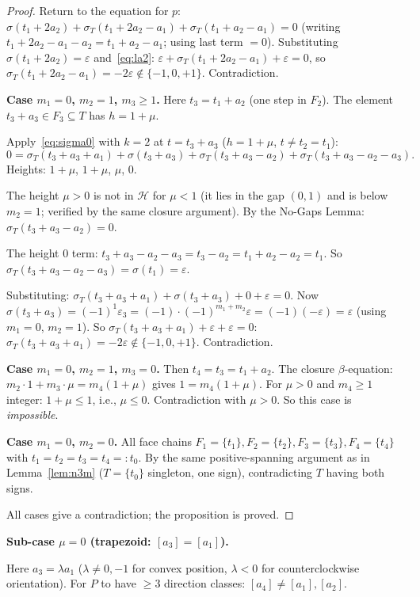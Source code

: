 \documentclass{article}
\begin{document}
\begin{proof}
Return to the equation for $p$:
$\sigma(t_1+2a_2)+\sigma_T(t_1+2a_2-a_1)+\sigma_T(t_1+a_2-a_1)=0$
(writing $t_1+2a_2-a_1-a_2=t_1+a_2-a_1$; using last term $=0$).
Substituting $\sigma(t_1+2a_2)=\varepsilon$ and~\eqref{eq:la2}:
$\varepsilon+\sigma_T(t_1+2a_2-a_1)+\varepsilon=0$,
so $\sigma_T(t_1+2a_2-a_1)=-2\varepsilon\notin\{-1,0,+1\}$.
Contradiction.

\textbf{Case $m_1=0$, $m_2=1$, $m_3\ge 1$.}
Here $t_3=t_1+a_2$ (one step in $F_2$).
The element $t_3+a_3\in F_3\subseteq T$ has $h=1+\mu$.

Apply~\eqref{eq:sigma0} with $k=2$ at $t=t_3+a_3$ ($h=1+\mu$, $t\ne t_2=t_1$):
\[
  0=\sigma_T(t_3+a_3+a_1)+\sigma(t_3+a_3)+\sigma_T(t_3+a_3-a_2)+\sigma_T(t_3+a_3-a_2-a_3).
\]
Heights: $1+\mu$, $1+\mu$, $\mu$, $0$.

The height $\mu>0$ is not in $\mathcal{H}$ for $\mu<1$ (it lies in the gap $(0,1)$
and is below $m_2=1$; verified by the same closure argument).
By the No-Gaps Lemma: $\sigma_T(t_3+a_3-a_2)=0$.

The height $0$ term: $t_3+a_3-a_2-a_3=t_3-a_2=t_1+a_2-a_2=t_1$.
So $\sigma_T(t_3+a_3-a_2-a_3)=\sigma(t_1)=\varepsilon$.

Substituting: $\sigma_T(t_3+a_3+a_1)+\sigma(t_3+a_3)+0+\varepsilon=0$.
Now $\sigma(t_3+a_3)=(-1)^1\varepsilon_3=(-1)\cdot(-1)^{m_1+m_2}\varepsilon=(-1)(-\varepsilon)=\varepsilon$
(using $m_1=0$, $m_2=1$).
So $\sigma_T(t_3+a_3+a_1)+\varepsilon+\varepsilon=0$:
$\sigma_T(t_3+a_3+a_1)=-2\varepsilon\notin\{-1,0,+1\}$.
Contradiction.

\textbf{Case $m_1=0$, $m_2=1$, $m_3=0$.}
Then $t_4=t_3=t_1+a_2$.  The closure $\beta$-equation:
$m_2\cdot 1+m_3\cdot\mu=m_4(1+\mu)$ gives $1=m_4(1+\mu)$.
For $\mu>0$ and $m_4\ge 1$ integer: $1+\mu\le 1$, i.e., $\mu\le 0$.
Contradiction with $\mu>0$.  So this case is \emph{impossible}.

\textbf{Case $m_1=0$, $m_2=0$.}
All face chains $F_1=\{t_1\},F_2=\{t_2\},F_3=\{t_3\},F_4=\{t_4\}$
with $t_1=t_2=t_3=t_4=:t_0$.
By the same positive-spanning argument as in Lemma~\ref{lem:n3m}
($T=\{t_0\}$ singleton, one sign), contradicting $T$ having both signs.

All cases give a contradiction; the proposition is proved.
\end{proof}

\medskip
\noindent\textbf{Sub-case $\mu=0$ (trapezoid: $[a_3]=[a_1]$).}

Here $a_3=\lambda a_1$ ($\lambda\ne 0,-1$ for convex position, $\lambda<0$ for
counterclockwise orientation).
For $P$ to have $\ge 3$ direction classes: $[a_4]\ne[a_1],[a_2]$.
\end{document}

